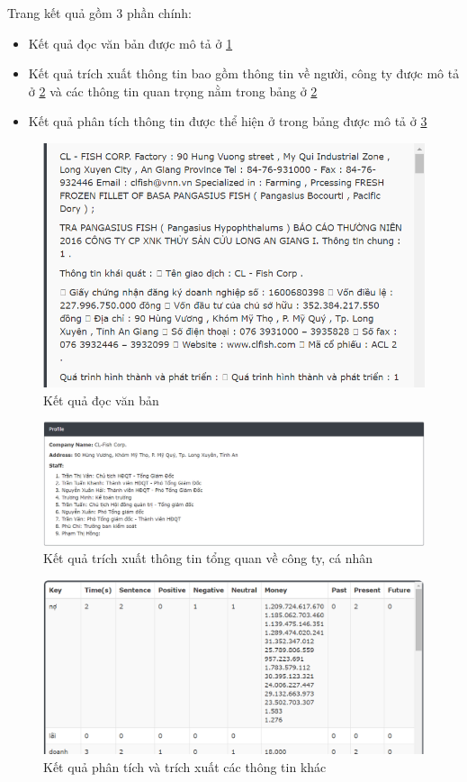 \documentclass[14pt]{extreport}
\begin{document}
Trang kết quả gồm 3 phần chính:
\begin{itemize}
    \item Kết quả đọc văn bản được mô tả ở \ref{fig:read}
    \item Kết quả trích xuất thông tin bao gồm thông tin về người, công ty được mô tả ở \ref{fig:extract} và các thông tin quan trọng nằm trong bảng ở \ref{fig:extract}
    \item Kết quả phân tích thông tin được thể hiện ở trong bảng được mô tả ở \ref{fig:analysis}
\end{itemize}
\begin{figure}
    \centering
    \includegraphics[scale= 0.7]{image/read.PNG}
    \caption{Kết quả đọc văn bản}
    \label{fig:read}
\end{figure}
\begin{figure}
    \centering
    \includegraphics[scale= 0.4]{image/extract.PNG}
    \caption{Kết quả trích xuất thông tin tổng quan về công ty, cá nhân}
    \label{fig:extract}
\end{figure}
\begin{figure}
    \centering
    \includegraphics[scale= 0.6]{image/analysis.PNG}
    \caption{Kết quả phân tích và trích xuất các thông tin khác}
    \label{fig:analysis}
\end{figure}
\newpage
\end{document}
